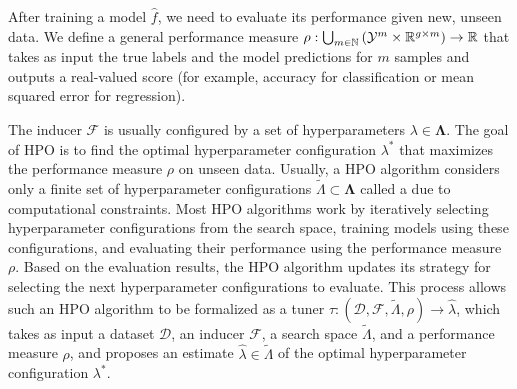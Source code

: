 After training a model \( \hat{f} \), we need to evaluate its performance given new, unseen data. We define a general performance measure \( \rho : \bigcup_{m \in \mathbb{N}} \left( \mathcal{Y}^m \times \mathbb{R}^{g \times m} \right) \to \mathbb{R} \) that takes as input the true labels and the model predictions for \( m \) samples and outputs a real-valued score (for example, accuracy for classification or mean squared error for regression).

The inducer \( \mathscr{F} \) is usually configured by a set of hyperparameters \( \lambda \in \boldsymbol\Lambda \). The goal of HPO is to find the optimal hyperparameter configuration \( \lambda^* \) that maximizes the performance measure \( \rho \) on unseen data. Usually, a HPO algorithm considers only a finite set of hyperparameter configurations \( \tilde{\Lambda} \subset \boldsymbol\Lambda \) called a  due to computational constraints. Most HPO algorithms work by iteratively selecting hyperparameter configurations from the search space, training models using these configurations, and evaluating their performance using the performance measure \( \rho \). Based on the evaluation results, the HPO algorithm updates its strategy for selecting the next hyperparameter configurations to evaluate. This process allows such an HPO algorithm to be formalized as a tuner \( \tau : \left( \mathcal{D}, \mathscr{F}, \tilde{\Lambda}, \rho \right) \to \hat\lambda \), which takes as input a dataset \( \mathcal{D} \), an inducer \( \mathscr{F} \), a search space \( \tilde{\Lambda} \), and a performance measure \( \rho \), and proposes an estimate \( \hat{\lambda} \in \tilde{\Lambda} \) of the optimal hyperparameter configuration \( \lambda^* \).
